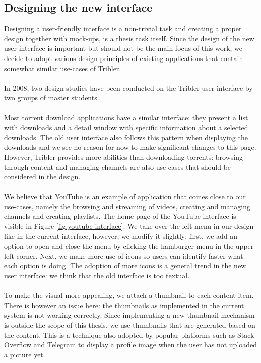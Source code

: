 \subsection{Designing the new interface}
Designing a user-friendly interface is a non-trivial task and creating a proper design together with mock-ups, is a thesis task itself. Since the design of the new user interface is important but should not be the main focus of this work, we decide to adopt various design principles of existing applications that contain somewhat similar use-cases of Tribler.\\\\
In 2008, two design studies have been conducted on the Tribler user interface by two groups of master students.\\\\
Most torrent download applications have a similar interface: they present a list with downloads and a detail window with specific information about a selected downloads. The old user interface also follows this pattern when displaying the downloads and we see no reason for now to make significant changes to this page. However, Tribler provides more abilities than downloading torrents: browsing through content and managing channels are also use-cases that should be considered in the design.\\\\
We believe that YouTube is an example of application that comes close to our use-cases, namely the browsing and streaming of videos, creating and managing channels and creating playlists. The home page of the YouTube interface is visible in Figure \ref{fig:youtube-interface}. We take over the left menu in our design like in the current interface, however, we modify it slightly: first, we add an option to open and close the menu by clicking the hamburger menu in the upper-left corner. Next, we make more use of icons so users can identify faster what each option is doing. The adoption of more icons is a general trend in the new user interface: we think that the old interface is too textual.\\\\
To make the visual more appealing, we attach a thumbnail to each content item. There is however an issue here: the thumbnails as implemented in the current system is not working correctly. Since implementing a new thumbnail mechanism is outside the scope of this thesis, we use thumbnails that are generated based on the content. This is a technique also adopted by popular platforms such as Stack Overflow and Telegram to display a profile image when the user has not uploaded a picture yet.\\\\
